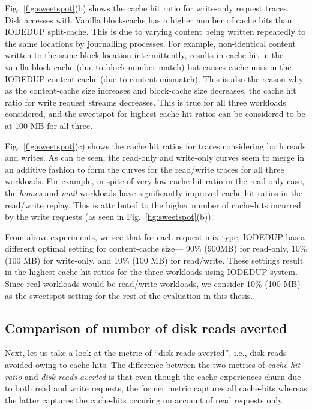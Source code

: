 Fig.~\ref{fig:sweetspot}(b) shows the cache hit ratio for write-only
request traces. Disk accesses with Vanilla block-cache has
a higher number of cache hits than IODEDUP split-cache. 
This is due to varying content being written repeatedly to the same
locations by journalling processes.
For example, non-identical content written to the same block location
intermittently,
results in cache-hit in the vanilla block-cache (due to block number match)
but causes cache-miss in the IODEDUP content-cache (due to content mismatch).
This is also the reason why,
as the content-cache size increases and block-cache size decreases, the
cache hit ratio for write request streams decreases. This is true for
all three workloads considered, and the sweetspot for highest cache-hit
ratios can be considered to be at 100 MB for all three.



Fig.~\ref{fig:sweetspot}(c) shows the cache hit ratios
for traces considering both reads and writes. As can be seen,
the read-only and write-only curves seem to merge in an additive fashion
to form the curves for the read/write traces for all three workloads.
For example, in spite of very low cache-hit ratio in the read-only case,
the \textit{homes} and \textit{mail} workloads have significantly improved
cache-hit ratios in the read/write replay. This is attributed to the
higher number of cache-hits incurred by the write requests (as seen in
Fig.~\ref{fig:sweetspot}(b)).

From above experiments, we see that for each request-mix type, IODEDUP has a
different optimal setting for content-cache size---
90\% (900MB) for read-only,
10\% (100 MB) for write-only, and
10\% (100 MB) for read/write.
These settings result in the highest cache hit
ratios for the three workloads using IODEDUP system. Since real
workloads would be read/write workloads, we consider 10\% (100 MB) as
the sweetspot setting for the rest of the evaluation in this thesis.

\subsection{Comparison of number of disk reads averted}
Next, let us take
a look at the metric of ``disk reads averted'', i.e., disk reads avoided owing
to cache hits. 
The difference between the two metrics of \textit{cache hit
ratio} and 
\textit{disk reads averted} 
is that even though the cache
experiences churn due to both read and write requests, the former metric
captures all cache-hits whereas the latter captures the cache-hits
occuring on account of read requests only.

